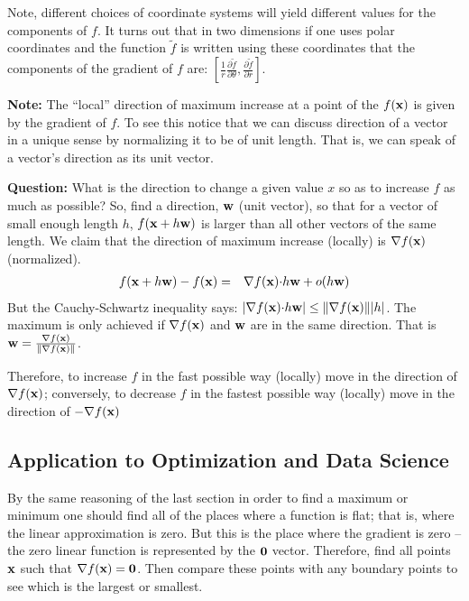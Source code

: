 \documentclass{article}
\begin{document}
Note, different choices of
coordinate systems will yield different
values for the components of $f$. It turns out that in two dimensions if one uses
polar coordinates and the function ${\tilde f}$ is written using these coordinates
that the components of the gradient of $f$ are:
$[\frac{1}{r} \frac{\partial {\tilde f}}{\partial \theta}, \frac{\partial {\tilde f}}{\partial r}]$.

{\bf Note:\/} The ``local''{} direction of maximum increase at a point of the
$f({\bf x})$ is given by the gradient of $f$. To see this notice that we can
discuss direction of a vector in a unique sense by normalizing it to be of unit length.
That is, we can speak of a vector's direction as its unit vector.

{\bf Question:\/} What is the direction to change a given value $x$ so as
to increase $f$ as much as possible? So, find a direction, ${\bf w}$ (unit vector),
so that for a vector of small enough length $h$, $f({\bf x} + h{\bf w})$ is larger than
all other vectors of the same length. We claim that the direction of
maximum increase (locally) is $\nabla f({\bf x})$ (normalized).
\begin{eqnarray}
  f({\bf x} + h {\bf w})  - f({\bf x}) & = & \nabla f({\bf x}) {\bf \cdot} h {\bf w} + o(h {\bf w})
\end{eqnarray}
But the Cauchy-Schwartz inequality says:
$|\nabla f({\bf x}) {\bf \cdot} h{\bf w}| \le \|\nabla f({\bf x})\| |h|$.
The maximum is only achieved if $\nabla f({\bf x})$ and ${\bf w}$ are in the
same direction. That is ${\bf w} = \frac{\nabla f({\bf x})}{\|\nabla f({\bf x})\|}$.

Therefore, to increase $f$ in the fast possible way (locally) move in the direction
of $\nabla f({\bf x})$; conversely, to decrease $f$ in the
fastest possible way (locally) move in the direction of $-\nabla f({\bf x})$

\subsection{Application to Optimization and Data Science}
By the same reasoning of the last section in order to find a maximum or minimum
one should find all of the places where a function is flat; that is, where the linear
approximation is zero. But this is the place where the gradient is zero -- the
zero linear function is represented by the ${\bf 0}$ vector. Therefore, find
all points ${\bf x}$ such that $\nabla f({\bf x}) = {\bf 0}$. Then compare
these points with any boundary points to see which is the largest or smallest.
\end{document}
